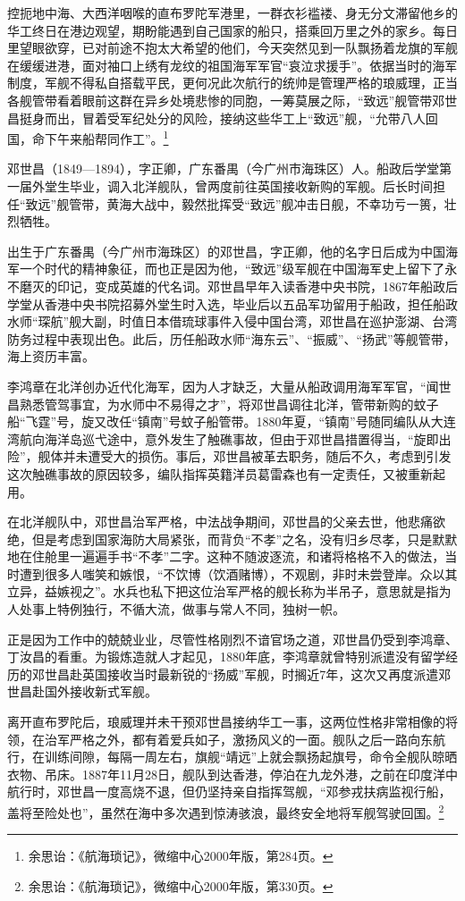 \documentclass[12pt,UTF8]{ctexbook}
\begin{document}
控扼地中海、大西洋咽喉的直布罗陀军港里，一群衣衫褴褛、身无分文滞留他乡的华工终日在港边观望，期盼能遇到自己国家的船只，搭乘回万里之外的家乡。每日里望眼欲穿，已对前途不抱太大希望的他们，今天突然见到一队飘扬着龙旗的军舰在缓缓进港，面对袖口上绣有龙纹的祖国海军军官“哀泣求援手”。依据当时的海军制度，军舰不得私自搭载平民，更何况此次航行的统帅是管理严格的琅威理，正当各舰管带看着眼前这群在异乡处境悲惨的同胞，一筹莫展之际，“致远”舰管带邓世昌挺身而出，冒着受军纪处分的风险，接纳这些华工上“致远”舰，“允带八人回国，命下午来船帮同作工”。\footnote{余思诒：《航海琐记》，微缩中心2000年版，第284页。}

邓世昌（1849—1894），字正卿，广东番禺（今广州市海珠区）人。船政后学堂第一届外堂生毕业，调入北洋舰队，曾两度前往英国接收新购的军舰。后长时间担任“致远”舰管带，黄海大战中，毅然批挥受“致远”舰冲击日舰，不幸功亏一篑，壮烈牺牲。

出生于广东番禺（今广州市海珠区）的邓世昌，字正卿，他的名字日后成为中国海军一个时代的精神象征，而也正是因为他，“致远”级军舰在中国海军史上留下了永不磨灭的印记，变成英雄的代名词。邓世昌早年入读香港中央书院，1867年船政后学堂从香港中央书院招募外堂生时入选，毕业后以五品军功留用于船政，担任船政水师“琛航”舰大副，时值日本借琉球事件入侵中国台湾，邓世昌在巡护澎湖、台湾防务过程中表现出色。此后，历任船政水师“海东云”、“振威”、“扬武”等舰管带，海上资历丰富。

李鸿章在北洋创办近代化海军，因为人才缺乏，大量从船政调用海军军官，“闻世昌熟悉管驾事宜，为水师中不易得之才”，将邓世昌调往北洋，管带新购的蚊子船“飞霆”号，旋又改任“镇南”号蚊子船管带。1880年夏，“镇南”号随同编队从大连湾航向海洋岛巡弋途中，意外发生了触礁事故，但由于邓世昌措置得当，“旋即出险”，舰体并未遭受大的损伤。事后，邓世昌被革去职务，随后不久，考虑到引发这次触礁事故的原因较多，编队指挥英籍洋员葛雷森也有一定责任，又被重新起用。

在北洋舰队中，邓世昌治军严格，中法战争期间，邓世昌的父亲去世，他悲痛欲绝，但是考虑到国家海防大局紧张，而背负“不孝”之名，没有归乡尽孝，只是默默地在住舱里一遍遍手书“不孝”二字。这种不随波逐流，和诸将格格不入的做法，当时遭到很多人嗤笑和嫉恨，“不饮博（饮酒赌博），不观剧，非时未尝登岸。众以其立异，益嫉视之”。水兵也私下把这位治军严格的舰长称为半吊子，意思就是指为人处事上特例独行，不循大流，做事与常人不同，独树一帜。

正是因为工作中的兢兢业业，尽管性格刚烈不谙官场之道，邓世昌仍受到李鸿章、丁汝昌的看重。为锻炼造就人才起见，1880年底，李鸿章就曾特别派遣没有留学经历的邓世昌赴英国接收当时最新锐的“扬威”军舰，时搁近7年，这次又再度派遣邓世昌赴国外接收新式军舰。

离开直布罗陀后，琅威理并未干预邓世昌接纳华工一事，这两位性格非常相像的将领，在治军严格之外，都有着爱兵如子，激扬风义的一面。舰队之后一路向东航行，在训练间隙，每隔一周左右，旗舰“靖远”上就会飘扬起旗号，命令全舰队晾晒衣物、吊床。1887年11月28日，舰队到达香港，停泊在九龙外港，之前在印度洋中航行时，邓世昌一度高烧不退，但仍坚持亲自指挥驾舰，“邓参戎扶病监视行船，盖将至险处也”，虽然在海中多次遇到惊涛骇浪，最终安全地将军舰驾驶回国。\footnote{余思诒：《航海琐记》，微缩中心2000年版，第330页。}
\end{document}
